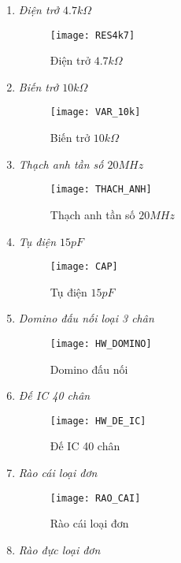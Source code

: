 \begin{enumerate}
\item \textit{Điện trở $4.7k\Omega$}
\begin{figure}[h]
\begin{center}
\texttt{[image: RES4k7]}
\end{center}
\caption{Điện trở $4.7k\Omega$}
\end{figure}
\item \textit{Biến trở $10k\Omega$}
\begin{figure}[h]
\begin{center}
\texttt{[image: VAR\_10k]}
\end{center}
\caption{Biến trở $10k\Omega$}
\end{figure}
\newpage
\item \textit{Thạch anh tần số $20MHz$}
\begin{figure}[h]
\begin{center}
\texttt{[image: THACH\_ANH]}
\end{center}
\caption{Thạch anh tần số $20MHz$}
\end{figure}
\item \textit{Tụ điện $15pF$}
\begin{figure}[h]
\begin{center}
\texttt{[image: CAP]}
\end{center}
\caption{Tụ điện $15pF$}
\end{figure}
\item \textit{Domino đấu nối loại 3 chân}
\begin{figure}[h]
\begin{center}
\texttt{[image: HW\_DOMINO]}
\end{center}
\caption{Domino đấu nối}
\end{figure}
\newpage
\item \textit{Đế IC 40 chân}
\begin{figure}[h]
\begin{center}
\texttt{[image: HW\_DE\_IC]}
\end{center}
\caption{Đế IC 40 chân}
\end{figure}
\item \textit{Rào cái loại đơn}
\begin{figure}[h]
\begin{center}
\texttt{[image: RAO\_CAI]}
\end{center}
\caption{Rào cái loại đơn}
\end{figure}
\item \textit{Rào đực loại đơn}

\end{enumerate}
